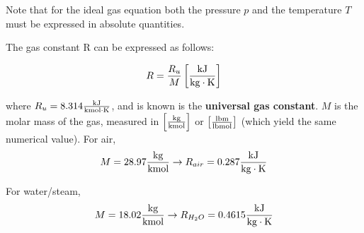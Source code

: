 Note that for the ideal gas equation both the pressure $p$ and the temperature $T$ must be expressed in absolute quantities.

The gas constant R can be expressed as follows:

\begin{equation}
  R = \frac{R_u}{M} \left[\frac{\rm kJ}{\rm kg \cdot K}\right]
\end{equation}

where $R_u = 8.314 \frac{\rm kJ}{\rm kmol \cdot K}$, and is known is the {\bf universal gas constant}.  $M$ is the molar mass of the gas, measured in $\left[\frac{\rm kg}{\rm kmol}\right]$ or $\left[\frac{\rm lbm}{\rm lbmol}\right]$ (which yield the same numerical value).
For air,
\begin{equation*}
  M = 28.97 \frac{\rm kg}{\rm kmol} \rightarrow R_{air} = 0.287 \frac{\rm kJ}{\rm kg\cdot K}
\end{equation*}

For water/steam,
\begin{equation*}
  M = 18.02 \frac{\rm kg}{\rm kmol} \rightarrow R_{H_2O} = 0.4615 \frac{\rm kJ}{\rm kg\cdot K}
\end{equation*}

